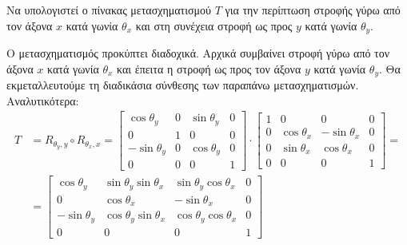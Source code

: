 \begin{example}
	Να υπολογιστεί ο πίνακας μετασχηματισμού \( T \) για την περίπτωση στροφής γύρω από τον άξονα \( x \) κατά γωνία \( \theta _x \) και στη συνέχεια στροφή ως προς \( y \) κατά γωνία \( \theta _y \).
\end{example}

\begin{solution}
	Ο μετασχηματισμός προκύπτει διαδοχικά. Αρχικά συμβαίνει στροφή γύρω από τον άξονα \( x \) κατά γωνία \( \theta _x \) και έπειτα η στροφή ως προς τον άξονα \( y \) κατά γωνία \( \theta  _y \). Θα εκμεταλλευτούμε τη διαδικάσια σύνθεσης των παραπάνω μετασχηματισμών. Αναλυτικότερα: 
\begin{align*}
	T &= R_{\theta _y, y}  \circ R_{\theta _x, x} =
		\begin{bmatrix}
		\cos \theta_y & 0 & \sin \theta_y & 0 \\
		0 & 1 & 0 & 0 \\
		-\sin \theta_y & 0 & \cos \theta_y & 0 \\
		0 & 0 & 0 & 1
		\end{bmatrix}
	\cdot	
		\begin{bmatrix}
		1 & 0 & 0 & 0 \\
		0 & \cos \theta_x & -\sin \theta_x & 0 \\
		0 & \sin \theta_x & \cos \theta_x & 0 \\
		0 & 0 & 0 & 1
		\end{bmatrix}
	= \\ 
	&=
		\begin{bmatrix}
		\cos \theta_y & \sin \theta_y \sin \theta_x & \sin \theta_y \cos \theta_x & 0 \\
		0 & \cos \theta_x & -\sin \theta_x & 0 \\
		-\sin \theta_y & \cos \theta_y \sin \theta_x & \cos \theta_y \cos \theta_x & 0 \\
		0 & 0 & 0 & 1
		\end{bmatrix}
\end{align*}

\end{solution}